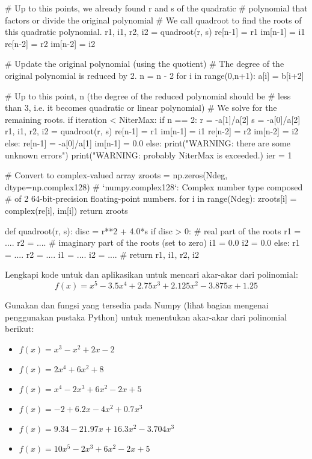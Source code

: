 \begin{pythoncode}
        # Up to this points, we already found r and s of the quadratic
        # polynomial that factors or divide the original polynomial
        # We call quadroot to find the roots of this quadratic polynomial.
        r1, i1, r2, i2  = quadroot(r, s)
        re[n-1] = r1
        im[n-1] = i1
        re[n-2] = r2
        im[n-2] = i2
        
        # Update the original polynomial (using the quotient)
        # The degree of the original polynomial is reduced by 2.
        n = n - 2
        for i in range(0,n+1):
            a[i] = b[i+2]
    
    # Up to this point, n (the degree of the reduced polynomial should be
    # less than 3, i.e. it becomes quadratic or linear polynomial)
    # We solve for the remaining roots.
    if iteration < NiterMax:
        if n == 2:
            r = -a[1]/a[2]
            s = -a[0]/a[2]
            r1, i1, r2, i2 = quadroot(r, s)
            re[n-1] = r1
            im[n-1] = i1
            re[n-2] = r2
            im[n-2] = i2
        else:
            re[n-1] = -a[0]/a[1]
            im[n-1] = 0.0
    else:
        print("WARNING: there are some unknown errors")
        print("WARNING: probably NiterMax is exceeded.)
        ier = 1
    
    # Convert to complex-valued array
    zroots = np.zeros(Ndeg, dtype=np.complex128)
    # `numpy.complex128`: Complex number type composed
    # of 2 64-bit-precision floating-point numbers.
    for i in range(Ndeg):
        zroots[i] = complex(re[i], im[i])
    return zroots
    
    
def quadroot(r, s):
    disc = r**2 + 4.0*s
    if disc > 0:
        # real part of the roots
        r1 = ....
        r2 = ....
        # imaginary part of the roots (set to zero)
        i1 = 0.0
        i2 = 0.0
    else:
        r1 = ....
        r2 = ....
        i1 = ....
        i2 = ....
    #
    return r1, i1, r2, i2    
\end{pythoncode}

\begin{soal}
Lengkapi kode untuk  dan aplikasikan untuk
mencari akar-akar dari polinomial:
\begin{equation*}
f(x) = x^5 - 3.5x^4 + 2.75x^3 + 2.125x^2 - 3.875x + 1.25
\end{equation*}
\end{soal}

\begin{soal}
Gunakan  dan fungsi yang tersedia pada Numpy
(lihat bagian mengenai penggunakan pustaka Python)
untuk menentukan akar-akar dari polinomial berikut:
\begin{itemize}
\item $f(x) = x^3 - x^2 + 2x - 2$
\item $f(x) = 2x^4 + 6x^2 + 8$
\item $f(x) = x^4 - 2x^3 + 6x^2 - 2x + 5$
\item $f(x) = -2 + 6.2x - 4x^2 + 0.7x^3$
\item $f(x) = 9.34 - 21.97x + 16.3x^2 - 3.704x^3$
\item $f(x) = 10x^5 - 2x^3 + 6x^2 - 2x + 5$
\end{itemize}
\end{soal}